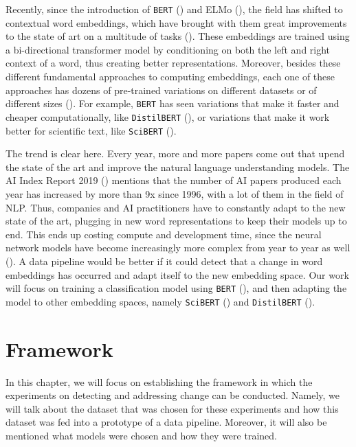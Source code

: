 \documentclass[12pt]{extreport}
\begin{document}
Recently, since the introduction of \texttt{BERT} (\cite{bert}) and ELMo (\cite{elmo}), the field has shifted to contextual word embeddings, which have brought with them great improvements to the state of art on a multitude of tasks (\cite{bert}). These embeddings are trained using a bi-directional transformer model by conditioning on both the left and right context of a word, thus creating better representations. Moreover, besides these different fundamental approaches to computing embeddings, each one of these approaches has dozens of pre-trained variations on different datasets or of different sizes (\cite{huggingface}). For example, \texttt{BERT} has seen variations that make it faster and cheaper computationally, like \texttt{DistilBERT} (\cite{distilbert}), or variations that make it work better for scientific text, like \texttt{SciBERT} (\cite{scibert}).

The trend is clear here. Every year, more and more papers come out that upend the state of the art and improve the natural language understanding models. The AI Index Report 2019 (\cite{aiindex2019}) mentions that the number of AI papers produced each year has increased by more than 9x since 1996, with a lot of them in the field of NLP. Thus, companies and AI practitioners have to constantly adapt to the new state of the art, plugging in new word representations to keep their models up to end. This ends up costing compute and development time, since the neural network models have become increasingly more complex from year to year as well (\cite{aiindex2019}). A data pipeline would be better if it could detect that a change in word embeddings has occurred and adapt itself to the new embedding space. Our work will focus on training a classification model using \texttt{BERT} (\cite{bert}), and then adapting the model to other embedding spaces, namely \texttt{SciBERT} (\cite{scibert}) and \texttt{DistilBERT} (\cite{distilbert}).

\chapter{Framework}

In this chapter, we will focus on establishing the framework in which the experiments on detecting and addressing change can be conducted. Namely, we will talk about the dataset that was chosen for these experiments and how this dataset was fed into a prototype of a data pipeline. Moreover, it will also be mentioned what models were chosen and how they were trained.
\end{document}
